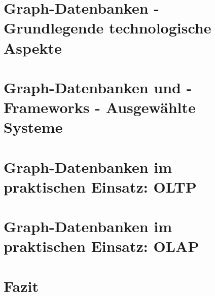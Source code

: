 \documentclass[12pt, bibliography=totoc, a4paper, abstractoff, numbers=noenddot]{scrreprt}
\begin{document}








\tableofcontents
\newpage



\setcounter{secnumdepth}{4}

\setcounter{chapter}{0}
\setcounter{section}{0}
\chapter{Graph-Datenbanken - Grundlegende technologische Aspekte}


\newpage
\setcounter{chapter}{1}
\setcounter{section}{0}
\chapter{Graph-Datenbanken und -Frameworks - Ausgewählte Systeme}


\newpage
\setcounter{chapter}{2}
\setcounter{section}{0}
\chapter{Graph-Datenbanken im praktischen Einsatz: OLTP}


\newpage
\setcounter{chapter}{3}
\setcounter{section}{0}
\chapter{Graph-Datenbanken im praktischen Einsatz: OLAP}


\newpage
\setcounter{chapter}{4}
\setcounter{section}{0}
\chapter{Fazit}


\newpage





\newpage
{}
\listoffigures
{}
\renewcommand\refname{Abkürzungsverzeichnis} 

\newpage




\end{document}
